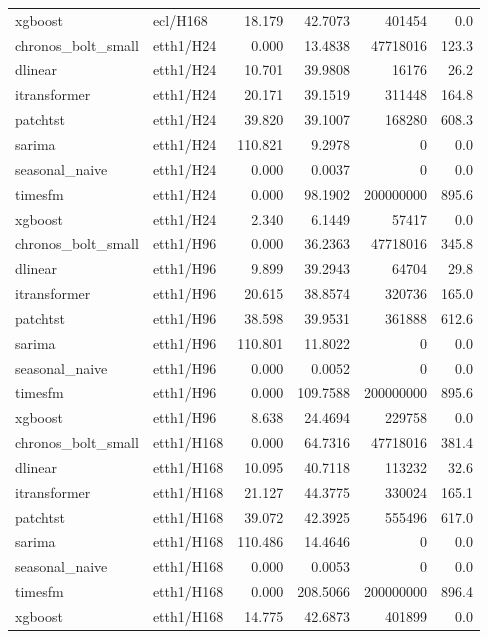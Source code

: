 \begin{table}[t]
{\begin{tabular}{llrrrr}
xgboost & ecl/H168 & 18.179 & 42.7073 & 401454 & 0.0 \\
chronos\_bolt\_small & etth1/H24 & 0.000 & 13.4838 & 47718016 & 123.3 \\
dlinear & etth1/H24 & 10.701 & 39.9808 & 16176 & 26.2 \\
itransformer & etth1/H24 & 20.171 & 39.1519 & 311448 & 164.8 \\
patchtst & etth1/H24 & 39.820 & 39.1007 & 168280 & 608.3 \\
sarima & etth1/H24 & 110.821 & 9.2978 & 0 & 0.0 \\
seasonal\_naive & etth1/H24 & 0.000 & 0.0037 & 0 & 0.0 \\
timesfm & etth1/H24 & 0.000 & 98.1902 & 200000000 & 895.6 \\
xgboost & etth1/H24 & 2.340 & 6.1449 & 57417 & 0.0 \\
chronos\_bolt\_small & etth1/H96 & 0.000 & 36.2363 & 47718016 & 345.8 \\
dlinear & etth1/H96 & 9.899 & 39.2943 & 64704 & 29.8 \\
itransformer & etth1/H96 & 20.615 & 38.8574 & 320736 & 165.0 \\
patchtst & etth1/H96 & 38.598 & 39.9531 & 361888 & 612.6 \\
sarima & etth1/H96 & 110.801 & 11.8022 & 0 & 0.0 \\
seasonal\_naive & etth1/H96 & 0.000 & 0.0052 & 0 & 0.0 \\
timesfm & etth1/H96 & 0.000 & 109.7588 & 200000000 & 895.6 \\
xgboost & etth1/H96 & 8.638 & 24.4694 & 229758 & 0.0 \\
chronos\_bolt\_small & etth1/H168 & 0.000 & 64.7316 & 47718016 & 381.4 \\
dlinear & etth1/H168 & 10.095 & 40.7118 & 113232 & 32.6 \\
itransformer & etth1/H168 & 21.127 & 44.3775 & 330024 & 165.1 \\
patchtst & etth1/H168 & 39.072 & 42.3925 & 555496 & 617.0 \\
sarima & etth1/H168 & 110.486 & 14.4646 & 0 & 0.0 \\
seasonal\_naive & etth1/H168 & 0.000 & 0.0053 & 0 & 0.0 \\
timesfm & etth1/H168 & 0.000 & 208.5066 & 200000000 & 896.4 \\
xgboost & etth1/H168 & 14.775 & 42.6873 & 401899 & 0.0 \\
\bottomrule
\end{tabular}%
}
\end{table}
